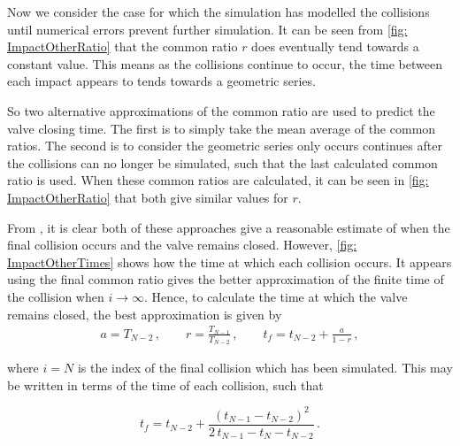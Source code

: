 Now we consider the case for which the simulation has modelled the collisions until numerical errors prevent further simulation. It can be seen from \cref{fig: ImpactOtherRatio} that the common ratio $r$ does eventually tend towards a constant value. This means as the collisions continue to occur, the time between each impact appears to tends towards a geometric series. 

So two alternative approximations of the common ratio are used to predict the valve closing time. The first is to simply take the mean average of the common ratios. The second is to consider the geometric series only occurs continues after the collisions can no longer be simulated, such that the last calculated common ratio is used.%
When these common ratios are calculated, it can be seen in \cref{fig: ImpactOtherRatio} that both give similar values for $r$.

From , it is clear both of these approaches give a reasonable estimate of when the final collision occurs and the valve remains closed. However, \cref{fig: ImpactOtherTimes} shows how the time at which each collision occurs. It appears using the final common ratio gives the better approximation of the finite time of the collision when $i \rightarrow \infty$. Hence, to calculate the time at which the valve remains closed, the best approximation is given by
~
\begin{equation*}
\begin{split}
    a = T_{N-2} \, , \qquad %
    r = \frac{T_{N-1}}{T_{N-2}} \, , \qquad %
    t_f = t_{N-2} + \frac{a}{1-r} \, ,
\end{split}
\end{equation*}

where $i = N$ is the index of the final collision which has been simulated. This may be written in terms of the time of each collision, such that

\begin{equation*}
    t_f = t_{N-2} + \frac{\left( t_{N-1} - t_{N-2} \right)^2}{2 \, t_{N-1} - t_N - t_{N-2}} \, .
\end{equation*}